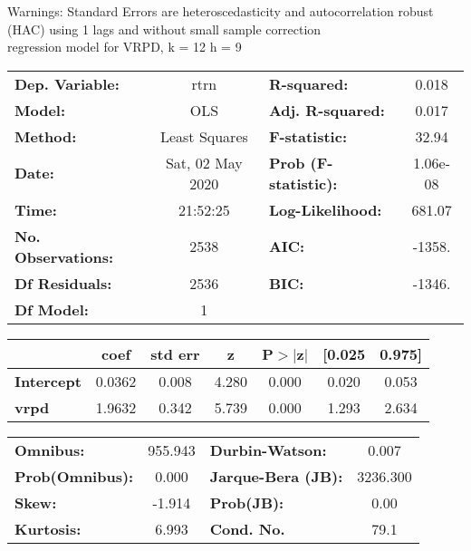 Warnings: \newline
 [1] Standard Errors are heteroscedasticity and autocorrelation robust (HAC) using 1 lags and without small sample correction\\ 

regression model for VRPD, k = 12 h = 9\begin{center}
\begin{tabular}{lclc}
\toprule
\textbf{Dep. Variable:}    &       rtrn       & \textbf{  R-squared:         } &     0.018   \\
\textbf{Model:}            &       OLS        & \textbf{  Adj. R-squared:    } &     0.017   \\
\textbf{Method:}           &  Least Squares   & \textbf{  F-statistic:       } &     32.94   \\
\textbf{Date:}             & Sat, 02 May 2020 & \textbf{  Prob (F-statistic):} &  1.06e-08   \\
\textbf{Time:}             &     21:52:25     & \textbf{  Log-Likelihood:    } &    681.07   \\
\textbf{No. Observations:} &        2538      & \textbf{  AIC:               } &    -1358.   \\
\textbf{Df Residuals:}     &        2536      & \textbf{  BIC:               } &    -1346.   \\
\textbf{Df Model:}         &           1      & \textbf{                     } &             \\
\bottomrule
\end{tabular}
\begin{tabular}{lcccccc}
                   & \textbf{coef} & \textbf{std err} & \textbf{z} & \textbf{P$> |$z$|$} & \textbf{[0.025} & \textbf{0.975]}  \\
\midrule
\textbf{Intercept} &       0.0362  &        0.008     &     4.280  &         0.000        &        0.020    &        0.053     \\
\textbf{vrpd}      &       1.9632  &        0.342     &     5.739  &         0.000        &        1.293    &        2.634     \\
\bottomrule
\end{tabular}
\begin{tabular}{lclc}
\textbf{Omnibus:}       & 955.943 & \textbf{  Durbin-Watson:     } &    0.007  \\
\textbf{Prob(Omnibus):} &   0.000 & \textbf{  Jarque-Bera (JB):  } & 3236.300  \\
\textbf{Skew:}          &  -1.914 & \textbf{  Prob(JB):          } &     0.00  \\
\textbf{Kurtosis:}      &   6.993 & \textbf{  Cond. No.          } &     79.1  \\
\bottomrule
\end{tabular}
\end{center}

